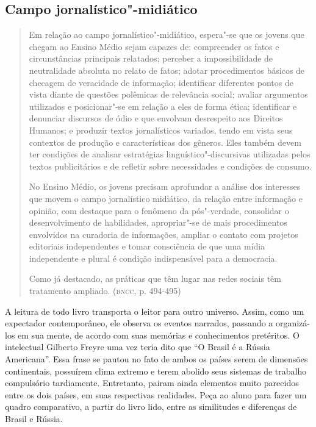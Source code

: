 \documentclass{extarticle}
\begin{document}
\subsection{Campo jornalístico"-midiático}

\begin{quote}
Em relação ao campo jornalístico"-midiático, espera"-se que os jovens
que chegam ao Ensino Médio sejam capazes de: compreender os fatos e
circunstâncias principais relatados; perceber a impossibilidade de
neutralidade absoluta no relato de fatos; adotar procedimentos básicos
de checagem de veracidade de informação; identificar diferentes pontos
de vista diante de questões polêmicas de relevância social; avaliar
argumentos utilizados e posicionar"-se em relação a eles de forma ética;
identificar e denunciar discursos de ódio e que envolvam desrespeito aos
Direitos Humanos; e produzir textos jornalísticos variados, tendo em
vista seus contextos de produção e características dos gêneros. Eles
também devem ter condições de analisar estratégias
linguístico"-discursivas utilizadas pelos textos publicitários e de
refletir sobre necessidades e condições de consumo.

No Ensino Médio, os jovens precisam aprofundar a análise dos interesses
que movem o campo jornalístico midiático, da relação entre informação e
opinião, com destaque para o fenômeno da pós"-verdade, consolidar o
desenvolvimento de habilidades, apropriar"-se de mais procedimentos
envolvidos na curadoria de informações, ampliar o contato com projetos
editoriais independentes e tomar consciência de que uma mídia
independente e plural é condição indispensável para a democracia.

Como já destacado, as práticas que têm lugar nas redes sociais têm
tratamento ampliado. (\textsc{bncc}, p. 494-495)
\end{quote}

A leitura de todo livro transporta o leitor para outro universo.
Assim, como um expectador contemporâneo, ele observa os eventos
narrados, passando a organizá-los em sua mente, de acordo com suas
memórias e conhecimentos pretéritos. O intelectual Gilberto Freyre uma
vez teria dito que ``O Brasil é a Rússia Americana''. Essa frase se
pautou no fato de ambos os países serem de dimensões continentais,
possuírem clima extremo e terem abolido seus sistemas de trabalho
compulsório tardiamente. Entretanto, pairam ainda elementos muito
parecidos entre os dois países, em suas respectivas realidades. Peça
ao aluno para fazer um quadro comparativo, a partir do livro lido,
entre as similitudes e diferenças de Brasil e Rússia.
\end{document}
